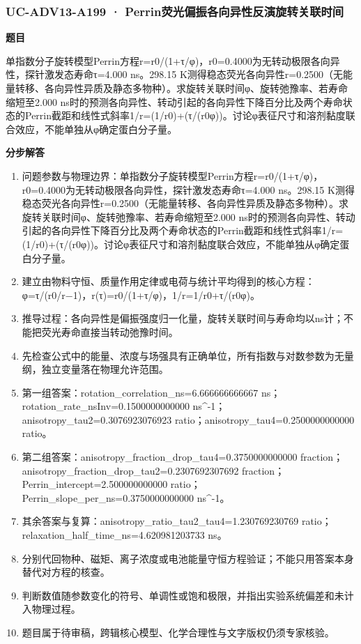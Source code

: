 \documentclass[UTF8,11pt,a4paper]{ctexart}
\begin{document}
\subsubsection*{UC-ADV13-A199 · Perrin荧光偏振各向异性反演旋转关联时间}
\noindent\textbf{题目}\par
单指数分子旋转模型Perrin方程r=r0/(1+τ/φ)，r0=0.4000为无转动极限各向异性，探针激发态寿命τ=4.000 ns。298.15 K测得稳态荧光各向异性r=0.2500（无能量转移、各向异性异质及静态多物种）。求旋转关联时间φ、旋转弛豫率、若寿命缩短至2.000 ns时的预测各向异性、转动引起的各向异性下降百分比及两个寿命状态的Perrin截距和线性式斜率1/r=(1/r0)+(τ/(r0φ))。讨论φ表征尺寸和溶剂黏度联合效应，不能单独从φ确定蛋白分子量。\par
\medskip\noindent\textbf{分步解答}
\begin{enumerate}
\item 问题参数与物理边界：单指数分子旋转模型Perrin方程r=r0/(1+τ/φ)，r0=0.4000为无转动极限各向异性，探针激发态寿命τ=4.000 ns。298.15 K测得稳态荧光各向异性r=0.2500（无能量转移、各向异性异质及静态多物种）。求旋转关联时间φ、旋转弛豫率、若寿命缩短至2.000 ns时的预测各向异性、转动引起的各向异性下降百分比及两个寿命状态的Perrin截距和线性式斜率1/r=(1/r0)+(τ/(r0φ))。讨论φ表征尺寸和溶剂黏度联合效应，不能单独从φ确定蛋白分子量。
\item 建立由物料守恒、质量作用定律或电荷与统计平均得到的核心方程：φ=τ/(r0/r−1)，r(τ)=r0/(1+τ/φ)，1/r=1/r0+τ/(r0φ)。
\item 推导过程：各向异性是偏振强度归一化量，旋转关联时间与寿命均以ns计；不能把荧光寿命直接当转动弛豫时间。
\item 先检查公式中的能量、浓度与场强具有正确单位，所有指数与对数参数为无量纲，独立变量落在物理允许范围。
\item 第一组答案：rotation\_correlation\_ns=6.666666666667 ns；rotation\_rate\_nsInv=0.1500000000000 ns\textasciicircum{}-1；anisotropy\_tau2=0.3076923076923 ratio；anisotropy\_tau4=0.2500000000000 ratio。
\item 第二组答案：anisotropy\_fraction\_drop\_tau4=0.3750000000000 fraction；anisotropy\_fraction\_drop\_tau2=0.2307692307692 fraction；Perrin\_intercept=2.500000000000 ratio；Perrin\_slope\_per\_ns=0.3750000000000 ns\textasciicircum{}-1。
\item 其余答案与复算：anisotropy\_ratio\_tau2\_tau4=1.230769230769 ratio；relaxation\_half\_time\_ns=4.620981203733 ns。
\item 分别代回物种、磁矩、离子浓度或电池能量守恒方程验证；不能只用答案本身替代对方程的核查。
\item 判断数值随参数变化的符号、单调性或饱和极限，并指出实验系统偏差和未计入物理过程。
\item 题目属于待审稿，跨辑核心模型、化学合理性与文字版权仍须专家核验。
\end{enumerate}
\end{document}
